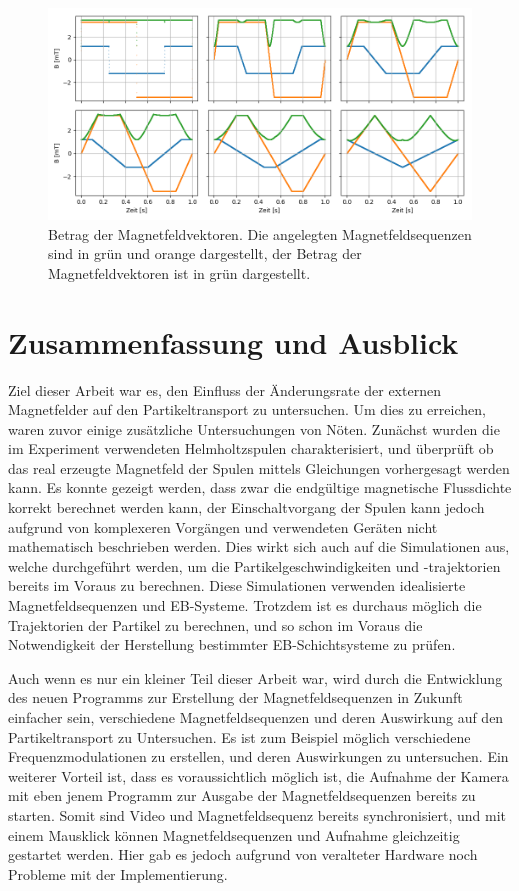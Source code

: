 \documentclass[page,pdftex,12pt,a4paper,twoside,openright]{scrbook}
\begin{document}
\begin{figure}[h]
\centering
\includegraphics[width=\textwidth]{./img/magnitude.png}
\caption{\label{fig-betrag}
Betrag der Magnetfeldvektoren. Die angelegten Magnetfeldsequenzen sind in grün und orange dargestellt, der Betrag der Magnetfeldvektoren ist in grün dargestellt.}
\end{figure}

\chapter{Zusammenfassung und Ausblick \label{sec-zusammenfassung}}
\label{sec:org6a77a06}
Ziel dieser Arbeit war es, den Einfluss der Änderungsrate der externen Magnetfelder auf den Partikeltransport zu untersuchen. Um dies zu erreichen, waren zuvor einige zusätzliche Untersuchungen von Nöten. Zunächst wurden die im Experiment verwendeten Helmholtzspulen charakterisiert, und überprüft ob das real erzeugte Magnetfeld der Spulen mittels Gleichungen vorhergesagt werden kann. Es konnte gezeigt werden, dass zwar die endgültige magnetische Flussdichte korrekt berechnet werden kann, der Einschaltvorgang der Spulen kann jedoch aufgrund von komplexeren Vorgängen und verwendeten Geräten nicht mathematisch beschrieben werden. Dies wirkt sich auch auf die Simulationen aus, welche durchgeführt werden, um die Partikelgeschwindigkeiten und -trajektorien bereits im Voraus zu berechnen. Diese Simulationen verwenden idealisierte Magnetfeldsequenzen und EB-Systeme. Trotzdem ist es durchaus möglich die Trajektorien der Partikel zu berechnen, und so schon im Voraus die Notwendigkeit der Herstellung bestimmter EB-Schichtsysteme zu prüfen.

Auch wenn es nur ein kleiner Teil dieser Arbeit war, wird durch die Entwicklung des neuen Programms zur Erstellung der Magnetfeldsequenzen in Zukunft einfacher sein, verschiedene Magnetfeldsequenzen und deren Auswirkung auf den Partikeltransport zu Untersuchen. Es ist zum Beispiel möglich verschiedene Frequenzmodulationen zu erstellen, und deren Auswirkungen zu untersuchen.
Ein weiterer Vorteil ist, dass es voraussichtlich möglich ist, die Aufnahme der Kamera mit eben jenem Programm zur Ausgabe der Magnetfeldsequenzen bereits zu starten. Somit sind Video und Magnetfeldsequenz bereits synchronisiert, und mit einem Mausklick können Magnetfeldsequenzen und Aufnahme gleichzeitig gestartet werden. Hier gab es jedoch aufgrund von veralteter Hardware noch Probleme mit der Implementierung.
\end{document}
